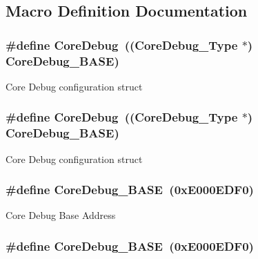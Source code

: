 \subsection{Macro Definition Documentation}
\hypertarget{group___c_m_s_i_s___c_m3__core__register_gab6e30a2b802d9021619dbb0be7f5d63d}{
\subsubsection[{Core\-Debug}]{\setlength{\rightskip}{0pt plus 5cm}\#define Core\-Debug~(({\bf Core\-Debug\-\_\-\-Type} $\ast$)     {\bf Core\-Debug\-\_\-\-B\-A\-S\-E})}}\label{group___c_m_s_i_s___c_m3__core__register_gab6e30a2b802d9021619dbb0be7f5d63d}
Core Debug configuration struct \hypertarget{group___c_m_s_i_s___c_m3__core__register_gab6e30a2b802d9021619dbb0be7f5d63d}{
\subsubsection[{Core\-Debug}]{\setlength{\rightskip}{0pt plus 5cm}\#define Core\-Debug~(({\bf Core\-Debug\-\_\-\-Type} $\ast$)     {\bf Core\-Debug\-\_\-\-B\-A\-S\-E})}}\label{group___c_m_s_i_s___c_m3__core__register_gab6e30a2b802d9021619dbb0be7f5d63d}
Core Debug configuration struct \hypertarget{group___c_m_s_i_s___c_m3__core__register_ga680604dbcda9e9b31a1639fcffe5230b}{
\subsubsection[{Core\-Debug\-\_\-\-B\-A\-S\-E}]{\setlength{\rightskip}{0pt plus 5cm}\#define Core\-Debug\-\_\-\-B\-A\-S\-E~(0x\-E000\-E\-D\-F0)}}\label{group___c_m_s_i_s___c_m3__core__register_ga680604dbcda9e9b31a1639fcffe5230b}
Core Debug Base Address \hypertarget{group___c_m_s_i_s___c_m3__core__register_ga680604dbcda9e9b31a1639fcffe5230b}{
\subsubsection[{Core\-Debug\-\_\-\-B\-A\-S\-E}]{\setlength{\rightskip}{0pt plus 5cm}\#define Core\-Debug\-\_\-\-B\-A\-S\-E~(0x\-E000\-E\-D\-F0)}}\label{group___c_m_s_i_s___c_m3__core__register_ga680604dbcda9e9b31a1639fcffe5230b}
